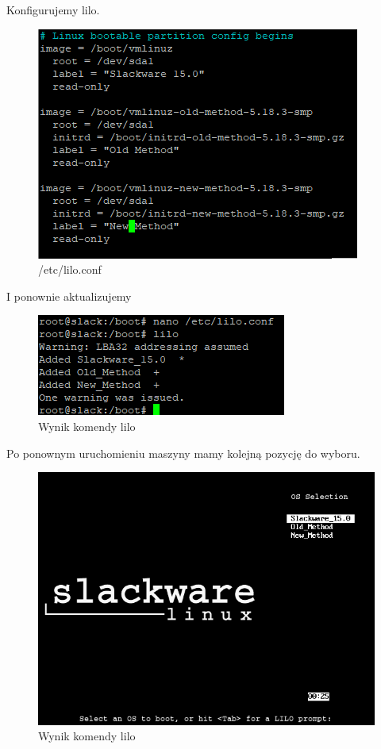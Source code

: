 \documentclass[a4paper,12pt,oneside]{book} %
\begin{document}
Konfigurujemy lilo.

\begin{figure}[h]
	\centering
	\includegraphics[scale=0.6]{38-lilo}
	\caption{/etc/lilo.conf}
\end{figure}

\pagebreak

I ponownie aktualizujemy

\begin{figure}[h]
	\centering
	\includegraphics[scale=0.6]{39-lilo}
	\caption{Wynik komendy lilo}
\end{figure}

Po ponownym uruchomieniu maszyny mamy kolejną pozycję do wyboru.

\begin{figure}[h]
	\centering
	\includegraphics[scale=0.6]{40-lilo}
	\caption{Wynik komendy lilo}
\end{figure}
\end{document}
